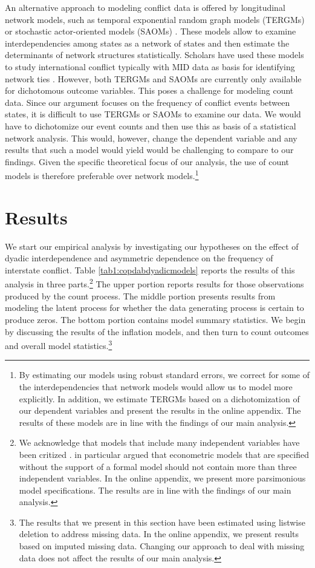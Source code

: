\documentclass[12pt]{article}
\theoremstyle{hypothesis}
\begin{document}
An alternative approach to modeling conflict data is offered by longitudinal network models, such as temporal exponential random graph models (TERGMs) or stochastic actor-oriented models (SAOMs) \citep{Hanneke:2010, Cranmer:2011,Snijders:1996}. These models allow to examine interdependencies among states as a network of states and then estimate the determinants of network structures statistically. Scholars have used these models to study international conflict typically with MID data as basis for identifying network ties \citep{Cranmer:2011,Warren:2016}. However, both TERGMs and SAOMs are currently only available for dichotomous outcome variables. This poses a challenge for modeling count data. Since our argument focuses on the frequency of conflict events between states, it is difficult to use TERGMs or SAOMs to examine our data. We would have to dichotomize our event counts and then use this as basis of a statistical network analysis. This would, however, change the dependent variable and any results that such a model would yield would be challenging to compare to our findings. Given the specific theoretical focus of our analysis, the use of count models is therefore preferable over network models.\footnote{By estimating our models using robust standard errors, we correct for some of the interdependencies that network models would allow us to model more explicitly. In addition, we estimate TERGMs based on a dichotomization of our dependent variables and present the results in the online appendix. The results of these models are in line with the findings of our main analysis.}

\section*{Results}

We start our empirical analysis by investigating our hypotheses on the effect of dyadic interdependence and asymmetric dependence on the frequency of interstate conflict. Table \ref{tab1:copdabdyadicmodels} reports the results of this analysis in three parts.\footnote{We acknowledge that models that include many independent variables have been critized \citep{Achen:2005}. \citet{Achen:2005} in particular argued that econometric models that are specified without the support of a formal model should not contain more than three independent variables. In the online appendix, we present more parsimonious model specifications. The results are in line with the findings of our main analysis.} The upper portion reports results for those observations produced by the count process. The middle portion presents results from modeling the latent process for whether the data generating process is certain to produce zeros. The bottom portion contains model summary statistics. We begin by discussing the results of the inflation models, and then turn to count outcomes and overall model statistics.\footnote{The results that we present in this section have been estimated using listwise deletion to address missing data. In the online appendix, we present results based on imputed missing data. Changing our approach to deal with missing data does not affect the results of our main analysis.}
\end{document}
